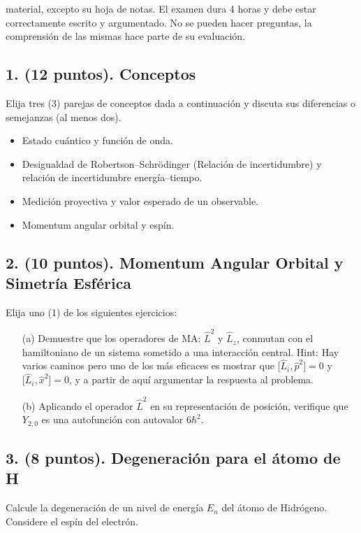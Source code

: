 \documentclass[a4paper,11pt]{article}
\begin{document}
material, excepto su hoja de notas. El examen dura 4 horas y debe estar correctamente escrito y argumentado. No se pueden hacer preguntas, la comprensión de las mismas hace parte de su evaluación.

\subsection*{1. (12 puntos). Conceptos}
Elija tres (3) parejas de conceptos dada a continuación y discuta sus diferencias o semejanzas (al menos dos).
\begin{itemize}
  \item Estado cuántico y función de onda.
  \item Desigualdad de Robertson–Schrödinger (Relación de incertidumbre) y relación de incertidumbre energía–tiempo.
  \item Medición proyectiva y valor esperado de un observable.
  \item Momentum angular orbital y espín.
\end{itemize}

\subsection*{2. (10 puntos). Momentum Angular Orbital y Simetría Esférica}
Elija uno (1) de los siguientes ejercicios:
\begin{enumerate}
  \item[(a)] Demuestre que los operadores de MA: $\hat L^2$ y $\hat L_z$, conmutan con el hamiltoniano de un sistema sometido a una interacción central. Hint: Hay varios caminos pero uno de los más eficaces es mostrar que $\big[\hat L_i,\hat p^2\big]=0$ y $\big[\hat L_i,\hat x^2\big]=0$, y a partir de aquí argumentar la respuesta al problema.
  \item[(b)] Aplicando el operador $\hat L^2$ en su representación de posición, verifique que $Y_{2,0}$ es una autofunción con autovalor $6\hbar^2$.
\end{enumerate}

\subsection*{3. (8 puntos). Degeneración para el átomo de H}
Calcule la degeneración de un nivel de energía $E_n$ del átomo de Hidrógeno. Considere el espín del electrón.
\end{document}
